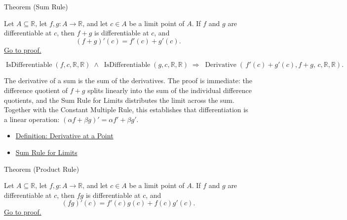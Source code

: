 \begin{theorembox}{Theorem (Sum Rule)}
\begin{theorem}
\label{thm:sum-rule}
Let $A \subseteq \mathbb{R}$, let $f, g : A \to \mathbb{R}$, and let $c \in A$ be a limit point of $A$. If $f$ and $g$ are differentiable at $c$, then $f + g$ is differentiable at $c$, and
\[
(f+g)'(c) = f'(c) + g'(c).
\]
\hyperref[prf:sum-rule]{Go to proof.}
\end{theorem}
\end{theorembox}

\begin{remark*}
\[
\operatorname{IsDifferentiable}(f,c,\mathbb{R},\mathbb{R}) \;\land\; \operatorname{IsDifferentiable}(g,c,\mathbb{R},\mathbb{R})
\;\Rightarrow\;
\operatorname{Derivative}(\,f'(c)+g'(c),f+g,\,c,\mathbb{R},\mathbb{R}).
\]
\end{remark*}

\begin{remark*}[Interpretation]
The derivative of a sum is the sum of the derivatives. The proof is immediate: the difference quotient of $f+g$ splits linearly into the sum of the individual difference quotients, and the Sum Rule for Limits distributes the limit across the sum. Together with the Constant Multiple Rule, this establishes that differentiation is a linear operation: $(\alpha f + \beta g)' = \alpha f' + \beta g'$.
\end{remark*}

\begin{dependencies}
\begin{itemize}
  \item \hyperref[def:derivative-at-a-point]{Definition: Derivative at a Point}
  \item \hyperref[thm:limit-sum]{Sum Rule for Limits}
\end{itemize}
\end{dependencies}


\begin{theorembox}{Theorem (Product Rule)}
\begin{theorem}
\label{thm:product-rule}
Let $A \subseteq \mathbb{R}$, let $f, g : A \to \mathbb{R}$, and let $c \in A$ be a limit point of $A$. If $f$ and $g$ are differentiable at $c$, then $fg$ is differentiable at $c$, and
\[
(fg)'(c) = f'(c)g(c) + f(c)g'(c).
\]
\hyperref[prf:product-rule]{Go to proof.}
\end{theorem}
\end{theorembox}

